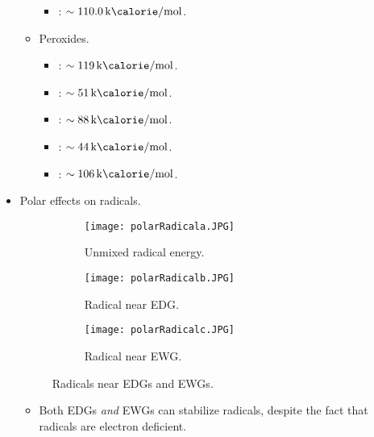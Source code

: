 \documentclass[../notes.tex]{subfiles}
\begin{document}
\begin{itemize}
\begin{itemize}
\begin{itemize}
            \item {}: $\sim\SI[per-mode=symbol]{110.0}{\kilo\calorie\per\mole}$.
        \end{itemize}
        \item Peroxides.
        \begin{itemize}
            \item {}: $\sim\SI[per-mode=symbol]{119}{\kilo\calorie\per\mole}$.
            \item {}: $\sim\SI[per-mode=symbol]{51}{\kilo\calorie\per\mole}$.
            \item {}: $\sim\SI[per-mode=symbol]{88}{\kilo\calorie\per\mole}$.
            \item {}: $\sim\SI[per-mode=symbol]{44}{\kilo\calorie\per\mole}$.
            \item {}: $\sim\SI[per-mode=symbol]{106}{\kilo\calorie\per\mole}$.
        \end{itemize}
    \end{itemize}
    \item Polar effects on radicals.
    \begin{figure}[h!]
        \centering
        \begin{subfigure}[b]{0.3\linewidth}
            \centering
            \texttt{[image: polarRadicala.JPG]}
            \caption{Unmixed radical energy.}
            \label{fig:polarRadicala}
        \end{subfigure}
        \begin{subfigure}[b]{0.3\linewidth}
            \centering
            \texttt{[image: polarRadicalb.JPG]}
            \caption{Radical near EDG.}
            \label{fig:polarRadicalb}
        \end{subfigure}
        \begin{subfigure}[b]{0.3\linewidth}
            \centering
            \texttt{[image: polarRadicalc.JPG]}
            \caption{Radical near EWG.}
            \label{fig:polarRadicalc}
        \end{subfigure}
        \caption{Radicals near EDGs and EWGs.}
        \label{fig:polarRadical}
    \end{figure}
    \pagebreak
    \begin{itemize}
        \item Both EDGs \emph{and} EWGs can stabilize radicals, despite the fact that radicals are electron deficient.

\end{itemize}
\end{itemize}
\end{document}
